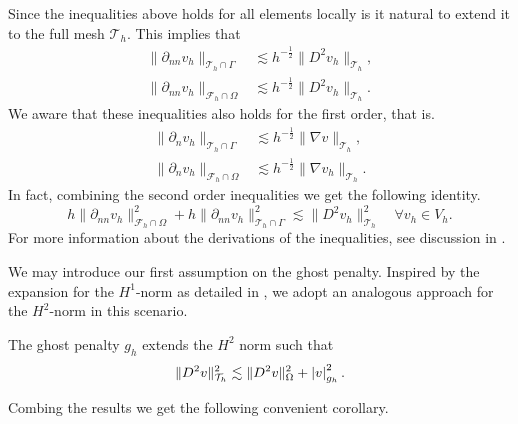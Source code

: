 Since the inequalities above holds for all elements locally is it natural to extend it to the full mesh  $\mathcal{T}_{h} $. This implies that
\begin{align}
\label{eq:bi_cut_inverse_1}
\| \partial _{nn} v_h \|_{ \mathcal{T} _{h} \cap \Gamma  }^{  } &\lesssim h^{-\frac{1}{2}} \| D^2 v_h \|_{ \mathcal{T}_h }^{  }, \\
\label{eq:bi_cut_inverse_2}
\| \partial _{nn}  v_h \|_{ \mathcal{F}_h \cap \Omega    }^{  }  &  \lesssim   h^{-\frac{1}{2}} \| D^2 v_h \|_{ \mathcal{T}_h  }^{  }.
\end{align}
    We aware that these inequalities also holds for the first order, that is.
\begin{align}
\label{eq:bi_n_cut_inverse_1}
\| \partial _{n} v_h \|_{ \mathcal{T} _{h} \cap \Gamma  }^{  } &\lesssim h^{-\frac{1}{2}} \| \nabla v \|_{ \mathcal{T}_h }^{  }, \\
\label{eq:bi_n_cut_inverse_2}
\| \partial _{n}  v_h \|_{ \mathcal{F}_h \cap \Omega    }^{  }  &  \lesssim   h^{-\frac{1}{2}} \| \nabla v_h \|_{ \mathcal{T}_h  }^{  }.
\end{align}
In fact, combining the second order inequalities we get the following identity.
\begin{equation}
\label{eq:bi_identity}
h\| \partial _{nn}  v_{h} \|_{ \mathcal{F}_h \cap \Omega    }^{2 } + h\| \partial _{nn} v_{h} \|_{ \mathcal{T} _{h} \cap \Gamma  }^{2  } \lesssim \| D^2 v_{h} \|_{ \mathcal{T} _{h}  }^{2  } \quad  \forall v_{h} \in V_{h}.
\end{equation}
For more information about the derivations of the inequalities, see discussion in \cite[Section 2.4]{gurkan2019stabilized}.

We may introduce our first assumption on the ghost penalty.  Inspired by the expansion for the $H^{1}$-norm as detailed in \cite[Equation 2.23]{gurkan2019stabilized}, we adopt an analogous approach for the $H^{2}$-norm in this scenario.
\begin{assumption*}[EP1]
    \label{as:bi_EP1}
    The ghost penalty $g_{h}$ extends the $H^{2}$ norm such that
    \begin{equation*}
    \| D^2 v \|_{ \mathcal{T} _{h} }^{ 2 } \lesssim  \| D^2 v \|_{ \Omega  }^{ 2 } + \left\lvert  v  \right\rvert _{g_{h}}^{2}.
    \end{equation*}
\end{assumption*}


Combing the results we get the following convenient corollary.

